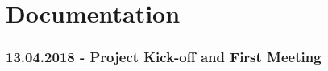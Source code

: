 \part{Documentation}\label{sec:documentation}

\section{13.04.2018 - Project Kick-off and First Meeting}


\newpage